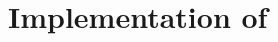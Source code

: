 \section{Implementation of \spl}
\label{sec:setup}


\clearpage

\clearpage

\clearpage

\clearpage

\clearpage
%

\clearpage
